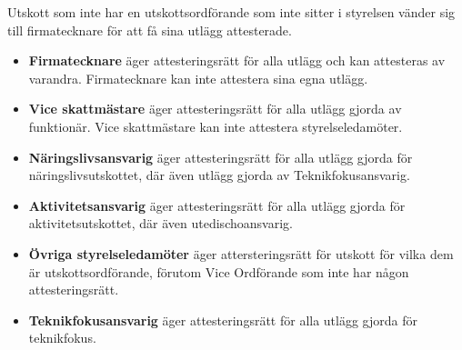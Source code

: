 \documentclass{dsekprotokoll}
\begin{document}
Utskott som inte har en utskottsordförande som inte sitter i styrelsen vänder sig till firmatecknare för att få sina utlägg attesterade.

\begin{itemize}
    \item \textbf{Firmatecknare} äger attesteringsrätt för alla utlägg och kan attesteras av varandra. Firmatecknare kan inte attestera sina egna utlägg.
    \item \textbf{Vice skattmästare} äger attesteringsrätt för alla utlägg gjorda av funktionär. Vice skattmästare kan inte attestera styrelseledamöter.
    \item \textbf{Näringslivsansvarig} äger attesteringsrätt för alla utlägg gjorda för näringslivsutskottet, där även utlägg gjorda av Teknikfokusansvarig.
    \item \textbf{Aktivitetsansvarig} äger attesteringsrätt för alla utlägg gjorda för aktivitetsutskottet, där även utedischoansvarig.
    \item \textbf{Övriga styrelseledamöter} äger attersteringsrätt för utskott för vilka dem är utskottsordförande, förutom Vice Ordförande som inte har någon attesteringsrätt.
    \item \textbf{Teknikfokusansvarig} äger attesteringsrätt för alla utlägg gjorda för teknikfokus.
\end{itemize}
\end{document}
